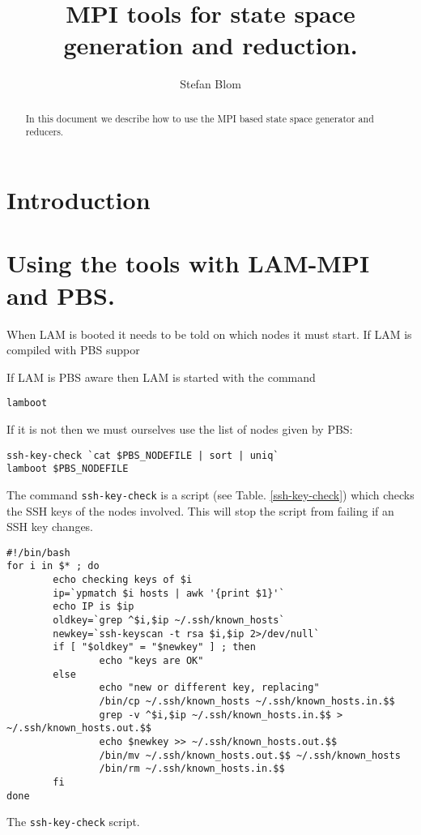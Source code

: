 \documentclass{cwiarticle}
\title{MPI tools for state space generation and reduction.}
\author{Stefan Blom}
\begin{document}
\maketitle

\begin{abstract}
In this document we describe how to use the MPI based state space generator and
reducers.
\end{abstract}

\tableofcontents

\section{Introduction}

\section{Using the tools with LAM-MPI and PBS.}

When LAM is booted it needs to be told on which nodes it must start.
If LAM is compiled with PBS suppor

If LAM is PBS aware then LAM is started with the command
\begin{verbatim}
lamboot
\end{verbatim}
If it is not then we must ourselves use the list of nodes given by PBS:
\begin{verbatim}
ssh-key-check `cat $PBS_NODEFILE | sort | uniq`
lamboot $PBS_NODEFILE
\end{verbatim}
The command \verb+ssh-key-check+ is a script (see Table. \ref{ssh-key-check}) which
checks the SSH keys of the nodes involved. This will stop the script
from failing if an SSH key changes.

\begin{table}
\begin{verbatim}
#!/bin/bash
for i in $* ; do
        echo checking keys of $i
        ip=`ypmatch $i hosts | awk '{print $1}'`
        echo IP is $ip
        oldkey=`grep ^$i,$ip ~/.ssh/known_hosts`
        newkey=`ssh-keyscan -t rsa $i,$ip 2>/dev/null`
        if [ "$oldkey" = "$newkey" ] ; then
                echo "keys are OK"
        else
                echo "new or different key, replacing"
                /bin/cp ~/.ssh/known_hosts ~/.ssh/known_hosts.in.$$
                grep -v ^$i,$ip ~/.ssh/known_hosts.in.$$ > ~/.ssh/known_hosts.out.$$
                echo $newkey >> ~/.ssh/known_hosts.out.$$
                /bin/mv ~/.ssh/known_hosts.out.$$ ~/.ssh/known_hosts
                /bin/rm ~/.ssh/known_hosts.in.$$
        fi
done
\end{verbatim}
\caption{The {\tt ssh-key-check} script.}\label{ssh-key-check}
\end{table}
\end{document}
